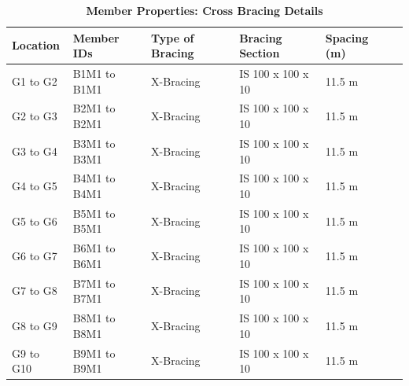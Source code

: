 \documentclass[12pt,a4paper]{report}
\numberwithin{table}{chapter}
\numberwithin{figure}{chapter}
\begin{document}
\newpage

\vspace{0.4em}
\setlength{\tabcolsep}{4pt}
\setlength\LTleft{0pt}
\setlength\LTright{\fill}

\begin{longtable}{|L{2.2cm}|L{2.2cm}|L{3.0cm}|L{2.5cm}|C{1.8cm}|C{1.8cm}|}
\caption{\textbf{Member Properties: Cross Bracing Details}}
\hline
\textbf{Location} & \textbf{Member IDs} & \textbf{Type of Bracing} & \textbf{Bracing Section} & \textbf{Spacing (m)} \\
\hline
G1 to G2 & B1M1 to B1M1 & X-Bracing & IS 100 x 100 x 10 & 11.5 m \\[6pt]
\hline
G2 to G3 & B2M1 to B2M1 & X-Bracing & IS 100 x 100 x 10 & 11.5 m \\[6pt]
\hline
G3 to G4 & B3M1 to B3M1 & X-Bracing & IS 100 x 100 x 10 & 11.5 m \\[6pt]
\hline
G4 to G5 & B4M1 to B4M1 & X-Bracing & IS 100 x 100 x 10 & 11.5 m \\[6pt]
\hline
G5 to G6 & B5M1 to B5M1 & X-Bracing & IS 100 x 100 x 10 & 11.5 m \\[6pt]
\hline
G6 to G7 & B6M1 to B6M1 & X-Bracing & IS 100 x 100 x 10 & 11.5 m \\[6pt]
\hline
G7 to G8 & B7M1 to B7M1 & X-Bracing & IS 100 x 100 x 10 & 11.5 m \\[6pt]
\hline
G8 to G9 & B8M1 to B8M1 & X-Bracing & IS 100 x 100 x 10 & 11.5 m \\[6pt]
\hline
G9 to G10 & B9M1 to B9M1 & X-Bracing & IS 100 x 100 x 10 & 11.5 m \\[6pt]
\hline
\end{longtable}

\vspace{0.4em}
\noindent
\setlength{\tabcolsep}{4pt}
\setlength\LTleft{0pt}
\setlength\LTright{\fill}
\end{document}

